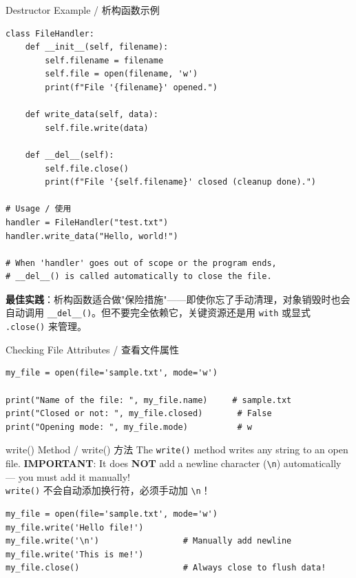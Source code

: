 \documentclass[11pt,a4paper]{report}
\let\oldtexttt\texttt
\renewcommand{\texttt}[1]{\textcolor{mainblue}{\oldtexttt{#1}}}
\begin{document}
\begin{examplebox}{Destructor Example / 析构函数示例}
\begin{lstlisting}
class FileHandler:
    def __init__(self, filename):
        self.filename = filename
        self.file = open(filename, 'w')
        print(f"File '{filename}' opened.")

    def write_data(self, data):
        self.file.write(data)

    def __del__(self):
        self.file.close()
        print(f"File '{self.filename}' closed (cleanup done).")

# Usage / 使用
handler = FileHandler("test.txt")
handler.write_data("Hello, world!")

# When 'handler' goes out of scope or the program ends,
# __del__() is called automatically to close the file.
\end{lstlisting}
    \textbf{最佳实践}：析构函数适合做"保险措施"——即使你忘了手动清理，对象销毁时也会自动调用 \texttt{\_\_del\_\_()}。但不要完全依赖它，关键资源还是用 \texttt{with} 或显式 \texttt{.close()} 来管理。
\end{examplebox}

\begin{examplebox}{Checking File Attributes / 查看文件属性}
\begin{lstlisting}
my_file = open(file='sample.txt', mode='w')

print("Name of the file: ", my_file.name)     # sample.txt
print("Closed or not: ", my_file.closed)       # False
print("Opening mode: ", my_file.mode)          # w
\end{lstlisting}
\end{examplebox}

\begin{examplebox}{write() Method / write() 方法}
    The \texttt{write()} method writes any string to an open file. \textbf{IMPORTANT}: It does \textbf{NOT} add a newline character (\texttt{\textbackslash n}) automatically — you must add it manually! \\
    \texttt{write()} 不会自动添加换行符，必须手动加 \texttt{\textbackslash n}！
\begin{lstlisting}
my_file = open(file='sample.txt', mode='w')
my_file.write('Hello file!')
my_file.write('\n')                 # Manually add newline
my_file.write('This is me!')
my_file.close()                     # Always close to flush data!
\end{lstlisting}
\end{examplebox}
\end{document}
